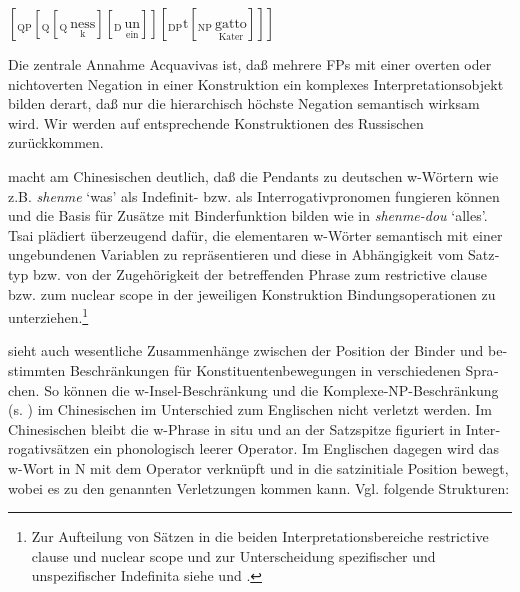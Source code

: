 \documentclass[output=paper, colorlinks, citecolor=brown, booklanguage=german]{langscibook}
\begin{document}
\begin{otherlanguage}{german}
\ea\label{ex:02:Kater}
    $[_\textrm{QP} [_\textrm{Q} [_\textrm{Q}\, \underset{\textrm{k}}{\textrm{ness}} ] [_\textrm{D}\, \underset{\textrm{ein}}{\textrm{un}} ]] [_\textrm{DP} \textrm{t} [_\textrm{NP}\, \underset{\textrm{Kater}}{\textrm{gatto}} ]]]$ \\
\z 

\begin{exe}
\end{exe}

\noindent Die zentrale Annahme Acquavivas ist, daß mehrere FPs mit einer overten oder nichtoverten Negation in einer Konstruktion ein komplexes Interpretationsobjekt bilden derart, daß nur die hierarchisch höchste Negation semantisch wirksam wird. Wir werden auf entsprechende Konstruktionen des Russischen zurückkommen.

\citet{Tsai1999} macht am Chinesischen deutlich, daß die Pendants zu deutschen w-Wörtern wie z.B. \textit{shenme} `was' als Indefinit- bzw. als Interrogativpronomen fungieren können und die Basis für Zusätze mit Binderfunktion bilden wie in \textit{shenme-dou} `alles'. Tsai plädiert überzeugend dafür, die elementaren w-Wörter semantisch mit einer ungebundenen Variablen zu repräsentieren und diese in Abhängigkeit vom Satztyp bzw. von der Zugehörigkeit der betreffenden Phrase zum restrictive clause bzw. zum nuclear scope in der jeweiligen Konstruktion Bindungsoperationen zu unterziehen.\footnote{Zur Aufteilung von Sätzen in die beiden Interpretationsbereiche restrictive clause und nuclear scope und zur Unterscheidung spezifischer und unspezifischer Indefinita siehe \citet{Heim1982} und \citet{Diesing1992}.} 

\citet[10f., 31ff.]{Tsai1999} sieht auch wesentliche Zusammenhänge zwischen der Position der Binder und bestimmten Beschränkungen für Konstituentenbewegungen in verschiedenen Sprachen. So können die w-Insel-Beschränkung und die Komplexe-NP-Beschränkung (s. \citealt{Ross1967}) im Chinesischen im Unterschied zum Englischen nicht verletzt werden. Im Chinesischen bleibt die w-Phrase in situ und an der Satzspitze figuriert in Interrogativsätzen ein phonologisch leerer O\-pe\-ra\-tor. Im Englischen dagegen wird das w-Wort in N mit dem Ope\-ra\-tor verknüpft und in die satzinitiale Position bewegt, wobei es zu den genannten Verletzungen kommen kann. Vgl. folgende Strukturen:


\end{otherlanguage}
\end{document}
